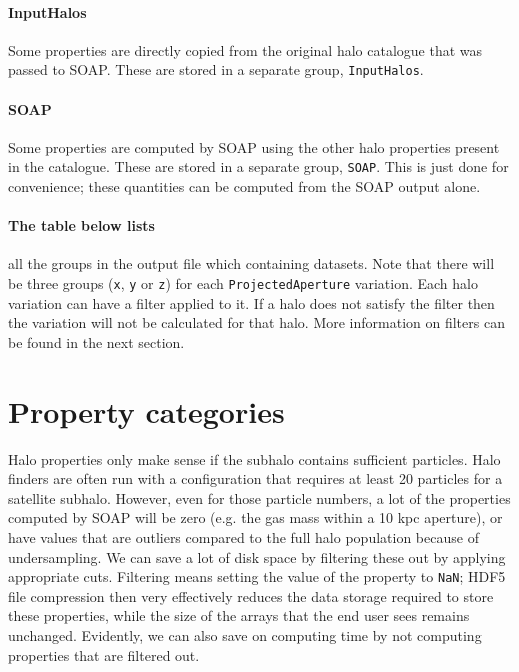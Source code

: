 \documentclass{article}
\begin{document}
\paragraph{InputHalos} Some properties are directly copied from the original halo catalogue that was passed
to SOAP. These are stored in a separate group, \verb+InputHalos+.

\paragraph{SOAP} Some properties are computed by SOAP using the other halo properties
present in the catalogue.
These are stored in a separate group, \verb+SOAP+. This is just done for convenience; these quantities can be computed from the SOAP output alone.

\paragraph{The table below lists} all the groups in the output file which containing datasets.
Note that there will be three groups (\verb+x+, \verb+y+ or \verb+z+) for each \verb+ProjectedAperture+ variation.
Each halo variation can have a filter applied to it. If a halo does not satisfy the filter then the variation will
not be calculated for that halo. More information on filters can be found in the next section.



\section{Property categories}

Halo properties only make sense if the subhalo contains sufficient particles. Halo finders are often run with a 
configuration that requires at least 20 particles for a satellite subhalo.  
However, even for those particle numbers, a lot of the properties computed by SOAP will be zero (e.g. 
the gas mass within a 10 kpc aperture), or have values that are outliers compared to the full halo population 
because of undersampling. We can save a lot of disk space by filtering these out by applying appropriate cuts. 
Filtering means setting the value of the property to \verb+NaN+; HDF5 file compression then very effectively 
reduces the data storage required to store these properties, while the size of the arrays that the end user 
sees remains unchanged. Evidently, we can also save on computing time by not computing properties that are 
filtered out.
\end{document}
